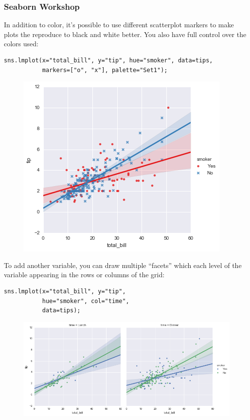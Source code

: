 \documentclass{beamer}
\begin{document}
\begin{frame}[fragile]
	\frametitle{Seaborn Workshop}
	\large
	
	In addition to color, it’s possible to use different scatterplot markers to make plots the reproduce to black and white better. You also have full control over the colors used:
\begin{verbatim}
sns.lmplot(x="total_bill", y="tip", hue="smoker", data=tips,
           markers=["o", "x"], palette="Set1");
 \end{verbatim}
\begin{figure}
	\centering
	\includegraphics[width=0.7\linewidth]{images/regression_41_0}
\end{figure}
\end{frame}
\begin{frame}[fragile]
	\large
To add another variable, you can draw multiple “facets” which each level of the variable appearing in the rows or columns of the grid:
\begin{verbatim}
sns.lmplot(x="total_bill", y="tip", 
           hue="smoker", col="time", 
           data=tips);
\end{verbatim}

\begin{figure}
\centering
\includegraphics[width=0.55\linewidth]{images/regression_43_0}
\end{figure}

\end{frame}
\end{document}
